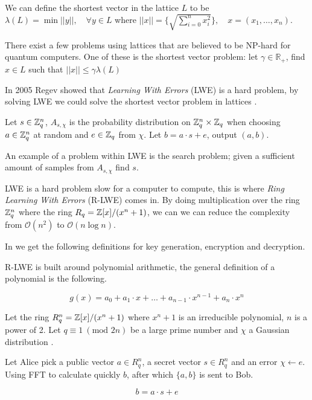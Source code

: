 We can define the shortest vector in the lattice $L$ to be
$\lambda(L) = \min || y ||, \quad \forall y \in L$ where
$||x|| = \{\sqrt{\sum_{i=0}^n x^2_i}\}, \quad x = (x_1, \ldots, x_n)$.

There exist a few problems using lattices that are believed to be NP-hard for
quantum computers. One of these is the shortest vector problem: let $\gamma \in
\mathbb{R}_+$, find $x \in L$
such that $||x|| \leq \gamma \lambda(L)$

In 2005 Regev showed that \textit{Learning With Errors} (LWE) is a hard
problem, by solving LWE we could solve the shortest vector problem in lattices
\citep{Regev05}.


\begin{definition}

    Let $s \in \mathbb{Z}^n_q$, $A_{s, \chi}$ is the probability distribution on
    $\mathbb{Z}^n_q \times \mathbb{Z}_q$ when choosing $a \in \mathbb{Z}^n_q$ at random and $e \in
    \mathbb{Z}_q$ from $\chi$. Let $b = a \cdot s + e$, output $(a,b)$.


\end{definition}

An example of a problem within LWE is the search problem; given a sufficient
amount of samples from $A_{s, \chi}$ find $s$.

LWE is a hard problem  slow for a computer to compute, this is where
\textit{Ring Learning With Errors} (R-LWE) comes in. By doing multiplication
over the ring $\mathbb{Z}^n_q$ where the ring $R_q = \mathbb{Z}[x] / (x^n + 1)$, we can we can
reduce the complexity from $\mathcal{O}(n^2)$ to $\mathcal{O}(n\log n)$.

In \citep{FPGA_Post_Quantum_Primitives} we get the following definitions for key
generation, encryption and decryption.

\begin{definition}
    R-LWE is built around polynomial arithmetic, the general definition of a
    polynomial is the following.

    \[
        g(x) = a_0 + a_1 \cdot x + \ldots + a_{n-1} \cdot x^{n-1} + a_n \cdot x^n
    \]

    Let the ring $R_q^n = \mathbb{Z}[x]/(x^n + 1)$ where $x^n + 1$ is an irreducible
    polynomial, $n$ is a power of 2. Let $q \equiv 1\ (\text{mod } 2n)$ be a
    large prime number and $\chi$ a Gaussian distribution
    \citep{FPGA_Post_Quantum_Primitives}.

    Let Alice pick a public vector $a \in R_q^n$, a secret vector $s \in R_q^n$
    and an error $\chi \leftarrow e$. Using FFT to calculate quickly $b$, after
    which $\{a,b\}$ is sent to Bob.

    \[b = a \cdot s + e \]

\end{definition}

